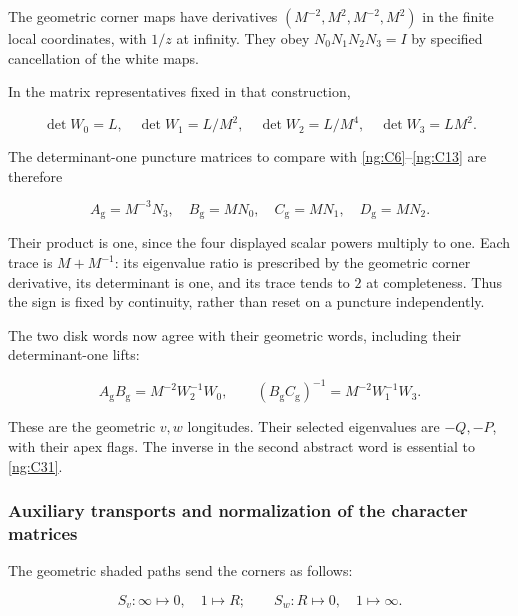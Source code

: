 The geometric corner maps have derivatives
\((M^{-2},M^2,M^{-2},M^2)\) in the finite local coordinates, with \(1/z\) at infinity. They obey
\(N_0N_1N_2N_3=I\) by specified cancellation of the white maps.

In the matrix representatives fixed in that construction,

\begin{equation}\label{ng:C29}
\det W_0=L,\quad \det W_1=L/M^2,\quad
 \det W_2=L/M^4,\quad \det W_3=LM^2.
\end{equation}

The determinant-one puncture matrices to compare with \eqref{ng:C6}--\eqref{ng:C13} are therefore

\begin{equation}\label{ng:C30}
A_{\mathrm g}=M^{-3}N_3,\quad
 B_{\mathrm g}=MN_0,\quad
 C_{\mathrm g}=MN_1,\quad
 D_{\mathrm g}=MN_2.
\end{equation}

Their product is one, since the four displayed scalar powers multiply to one. Each trace is \(M+M^{-1}\): its eigenvalue ratio is prescribed by the geometric corner derivative, its determinant is one, and its trace tends to \(2\) at completeness. Thus the sign is fixed by continuity, rather than reset on a puncture independently.

The two disk words now agree with their geometric words, including their determinant-one lifts:

\begin{equation}\label{ng:C31}
A_{\mathrm g}B_{\mathrm g}=M^{-2}W_2^{-1}W_0,\qquad
 (B_{\mathrm g}C_{\mathrm g})^{-1}
                         =M^{-2}W_1^{-1}W_3.
\end{equation}

These are the geometric \(v,w\) longitudes. Their selected eigenvalues are \(-Q,-P\), with their apex flags. The inverse in the second abstract word is essential to \eqref{ng:C31}.

\subsubsection{Auxiliary transports and normalization of the character matrices}\label{ng:actual-auxiliary-transports-and-character-normalization}

The geometric shaded paths send the corners as follows:

\begin{equation}\label{ng:C32}
S_v:\infty\mapsto0,\quad 1\mapsto R;\qquad
 S_w:R\mapsto0,\quad 1\mapsto\infty.
\end{equation}

